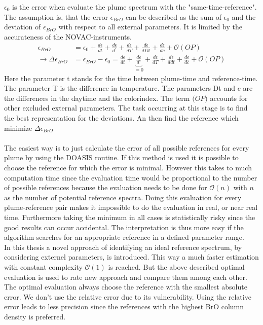 \documentclass  [
  paper    = a4,
  BCOR     = 10mm,
  twoside,
  fontsize = 12pt,
  fleqn,
  toc      = bibnumbered,
  toc      = listofnumbered,
  numbers  = noendperiod,
  headings = normal,
  listof   = leveldown,
  version  = 3.03
]                                       {scrreprt}
\begin{document}
	$\epsilon_{0}$ is the  error when evaluate the plume spectrum with the "same-time-reference".
	The assumption is, that the  error $\epsilon_{BrO}$ can be described as the sum of $\epsilon_{0}$ and the deviation of $\epsilon_{BrO}$ with respect to all external parameters. It is limited by the accurateness of the NOVAC-instruments.
	\begin{align}
		\epsilon_{BrO} &=  \epsilon_{0}+\frac{d\epsilon}{dt}+\frac{d\epsilon}{d ^{\circ}}+\frac{d\epsilon}{dT}+\frac{d\epsilon}{dDt} +\frac{d\epsilon}{dc} + \mathcal{O}\left(OP\right) \\
		\rightarrow \Delta \epsilon_{BrO} &= \epsilon_{BrO} - \epsilon_{0} =\frac{d\epsilon}{dt}+\underbrace{\frac{d\epsilon}{d ^{\circ}}}_{=0}+\frac{d\epsilon}{dT}+\frac{d\epsilon}{ddt} +\frac{d\epsilon}{dc} + \mathcal{O}\left(OP\right) 
		\label{calc:err}
	\end{align}
	Here the parameter t stands for the time between plume-time and reference-time. The parameter T is the difference in temperature. The parameters Dt and c are the differences in the daytime and the colorindex. The term $\mathcal(OP)$ accounts for other excluded external parameters.
	The task occurring at this stage is to find the best representation for the deviations. An then find the reference which minimize $\Delta \epsilon_{BrO} $\\
	\\
	The easiest way is to just calculate the  error of all possible references for every plume by using the DOASIS routine. If this method is used it is possible to choose the reference for which the  error is minimal. However this takes to much computation time since the evaluation time would be proportional to the number of possible references because the evaluation needs to be done for $\mathcal{O}(n)$ with $n$ as the number of potential reference spectra. Doing this evaluation for every plume-reference pair makes it impossible to do the evaluation in real, or near real time.
	Furthermore taking the minimum in all cases is statistically risky since the good results can occur accidental. The interpretation is thus more easy if the algorithm searches for an appropriate reference in a defined parameter range.\\
	In this thesis a novel approach of identifying an ideal reference spectrum, by considering externel parameters, is introduced. This way a much faster estimation with constant complexity $\mathcal{O}(1)$ is reached.
	But the above described optimal evaluation is used to rate new approach and compare them among each other. The optimal evaluation always choose the reference with the smallest absolute error. We don't use the relative error due to its vulnerability. Using the relative error leads to less precision since the references with the highest BrO column density is preferred.\\
\end{document}
